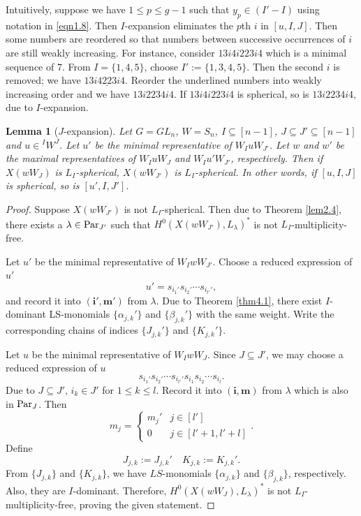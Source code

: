\documentclass[12pt]{amsart}
\newtheorem{lemma}[theorem]{Lemma}
\theoremstyle{definition}
\theoremstyle{remark}
\newcommand{\Parj}{{\rm Par}_J}
\begin{document}
Intuitively, suppose we have $1 \leq p \leq g-1$ such that $y_p \in  (I'-I)$ using notation in \eqref{eqn1.8}. Then $I$-expansion eliminates the $p$th $i$ in $[u,I,J]$. Then some numbers are reordered so that numbers between successive occurrences of $i$ are still weakly increasing. For instance, consider $13i4 i223i4$ which is a minimal sequence of $7$. From $I = \{1,4,5 \}$, choose $I' := \{ 1, 3, 4, 5 \}$. Then the second $i$ is removed; we have $13i\underline{4223}i4$. Reorder the underlined numbers into weakly increasing order and we have $13i2234i4$. If $13i4i223i4$ is spherical, so is $13i2234i4$, due to $I$-expansion.

\begin{lemma}[$J$-expansion]\label{lem4.5}
Let $G = GL_n$, $W=S_n$, $I \subseteq [n-1]$, $J \subseteq J' \subseteq [n-1]$ and $u \in {}^I W^J$. Let $u'$ be the minimal representative of $W_I u W_{J'}$. Let $w$ and $w'$ be the maximal representatives of $W_I u W_J$ and $W_I u' W_{J'}$, respectively. Then if $X(wW_{J})$ is $L_I$-spherical, $X(wW_{J'})$ is $L_I$-spherical. In other words, if $[u,I,J]$ is spherical, so is $[u',I , J']$.
\end{lemma}
\begin{proof}
Suppose $X(wW_{J'})$ is not $L_I$-spherical. Then due to Theorem \ref{lem2.4}, there exists a $\lambda \in {\rm Par}_{J'}$ such that $H^0 (X(wW_{J'}), L_\lambda)^*$ is not $L_I$-multiplicity-free.

Let $u'$ be the minimal representative of $W_I w W_{J'}$. Choose a reduced expression of $u'$
\begin{equation}
u' = s_{i_1'} s_{i_2'} \cdots s_{i_{l'}'},
\end{equation}
and record it into $(\mathbf{i'}, \mathbf{m}')$ from $\lambda$. Due to Theorem \ref{thm4.1}, there exist $I$-dominant LS-monomials $\{\alpha_{j,k}'\}$ and $\{\beta_{j,k}'\}$ with the same weight. Write the corresponding chains of indices $\{J_{j,k}'\}$ and $\{K_{j,k}'\}$.

Let $u$ be the minimal representative of $W_I w W_J$. Since $J \subseteq J'$, we may choose a reduced expression of $u$
\begin{equation}
s_{i_1 ' }s_{i_2 ' } \cdots s_{i_{l'}'} s_{i_1} s_{i_2} \cdots s_{i_l}.
\end{equation}
Due to $J \subseteq J'$, $i_k \in J'$ for $1 \leq k \leq l$. Record it into $(\mathbf{i}, \mathbf{m})$ from $\lambda$ which is also in $\Parj$. Then
\begin{equation}
m_j = 
\begin{cases}
m_j ' & j \in [l'] \\
0 & j \in [l'+1 , l' + l]
\end{cases}
.
\end{equation}
Define
\begin{equation}
J_{j,k}:= J_{j,k}' \quad K_{j,k}:= K_{j,k}'.
\end{equation}
From $\{J_{j,k}\}$ and $\{K_{j,k}\}$, we have $LS$-monomials $\{\alpha_{j,k}\}$ and $\{\beta_{j,k}\}$, respectively. Also, they are $I$-dominant. Therefore, $H^0(X(wW_J), L_\lambda)^*$ is not $L_I$-multiplicity-free, proving the given statement.
\end{proof}
\end{document}
